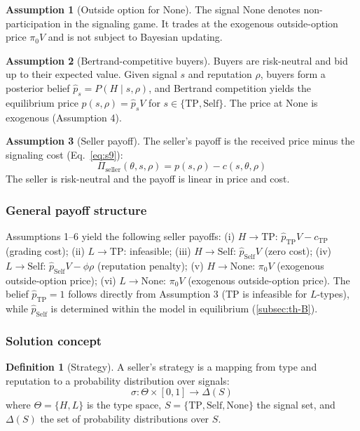 \documentclass[11pt,letterpaper]{article}
\theoremstyle{definition}
\newtheorem{definition}{Definition}[section]
\newtheorem{assumption}{Assumption}
\begin{document}
\begin{assumption}[Outside option for None]
The signal $\text{None}$ denotes non-participation in the signaling game. It trades at the exogenous outside-option price $\pi_0 V$ and is not subject to Bayesian updating.
\end{assumption}

\begin{assumption}[Bertrand-competitive buyers]
Buyers are risk-neutral and bid up to their expected value. Given signal $s$ and reputation $\rho$, buyers form a posterior belief $\hat{p}_s = P(H \mid s, \rho)$, and Bertrand competition yields the equilibrium price $p(s, \rho) = \hat{p}_s V$ for $s \in \{\text{TP}, \text{Self}\}$. The price at None is exogenous (Assumption 4).
\end{assumption}

\begin{assumption}[Seller payoff]
The seller's payoff is the received price minus the signaling cost (Eq.~\ref{eq:s9}):
\begin{equation}
\Pi_{\text{seller}}(\theta, s, \rho) = p(s, \rho) - c(s, \theta, \rho) \label{eq:s9}
\end{equation}
The seller is risk-neutral and the payoff is linear in price and cost.
\end{assumption}

\subsubsection*{General payoff structure}

Assumptions 1--6 yield the following seller payoffs: (i) $H \to \text{TP}$: $\hat{p}_{\text{TP}} V - c_{\text{TP}}$ (grading cost); (ii) $L \to \text{TP}$: infeasible; (iii) $H \to \text{Self}$: $\hat{p}_{\text{Self}} V$ (zero cost); (iv) $L \to \text{Self}$: $\hat{p}_{\text{Self}} V - \phi\rho$ (reputation penalty); (v) $H \to \text{None}$: $\pi_0 V$ (exogenous outside-option price); (vi) $L \to \text{None}$: $\pi_0 V$ (exogenous outside-option price). The belief $\hat{p}_{\text{TP}} = 1$ follows directly from Assumption 3 (TP is infeasible for $L$-types), while $\hat{p}_{\text{Self}}$ is determined within the model in equilibrium (\ref{subsec:th-B}).

\subsubsection*{Solution concept}

\begin{definition}[Strategy]
A seller's strategy is a mapping from type and reputation to a probability distribution over signals:
\[\sigma: \Theta \times [0, 1] \to \Delta(S)\]
where $\Theta = \{H, L\}$ is the type space, $S = \{\text{TP}, \text{Self}, \text{None}\}$ the signal set, and $\Delta(S)$ the set of probability distributions over $S$.
\end{definition}
\end{document}
